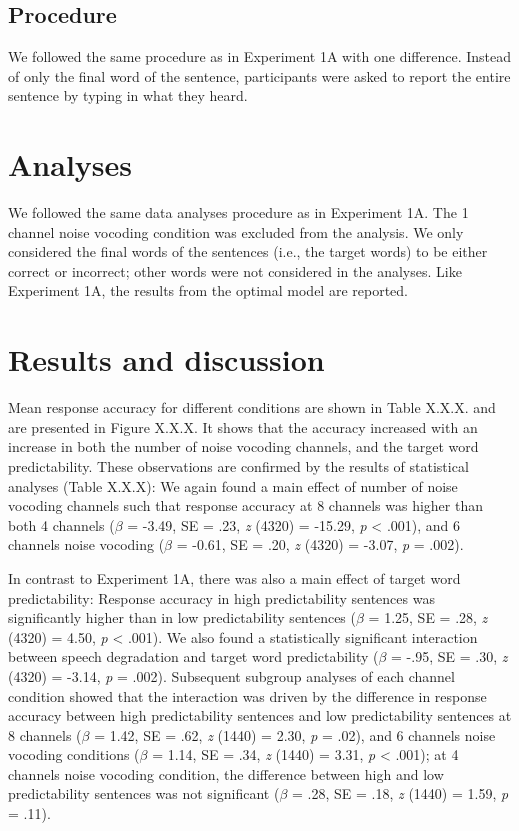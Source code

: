 \documentclass[a4paper, nobind]{templates/ociamthesis}
\begin{document}
\hypertarget{procedure-1}{%
\subsection{Procedure}\label{procedure-1}}

We followed the same procedure as in Experiment 1A with one difference.
Instead of only the final word of the sentence, participants were asked to report the entire sentence by typing in what they heard.

\hypertarget{analyses-1}{%
\section{Analyses}\label{analyses-1}}

We followed the same data analyses procedure as in Experiment 1A.
The 1 channel noise vocoding condition was excluded from the analysis.
We only considered the final words of the sentences (i.e., the target words) to be either correct or incorrect; other words were not considered in the analyses.
Like Experiment 1A, the results from the optimal model are reported.

\hypertarget{results-and-discussion-1}{%
\section{Results and discussion}\label{results-and-discussion-1}}

Mean response accuracy for different conditions are shown in Table X.X.X. and are presented in Figure X.X.X.
It shows that the accuracy increased with an increase in both the number of noise vocoding channels, and the target word predictability.
These observations are confirmed by the results of statistical analyses (Table X.X.X):
We again found a main effect of number of noise vocoding channels such that response accuracy at 8 channels was higher than both 4 channels (\(\beta\) = -3.49, SE = .23, \emph{z} (4320) = -15.29, \emph{p} \textless{} .001), and 6 channels noise vocoding (\(\beta\) = -0.61, SE = .20, \emph{z} (4320) = -3.07, \emph{p} = .002).

In contrast to Experiment 1A, there was also a main effect of target word predictability:
Response accuracy in high predictability sentences was significantly higher than in low predictability sentences (\(\beta\) = 1.25, SE = .28, \emph{z} (4320) = 4.50, \emph{p} \textless{} .001).
We also found a statistically significant interaction between speech degradation and target word predictability (\(\beta\) = -.95, SE = .30, \emph{z} (4320) = -3.14, \emph{p} = .002).
Subsequent subgroup analyses of each channel condition showed that the interaction was driven by the difference in response accuracy between high predictability sentences and low predictability sentences at 8 channels (\(\beta\) = 1.42, SE = .62, \emph{z} (1440) = 2.30, \emph{p} = .02), and 6 channels noise vocoding conditions (\(\beta\) = 1.14, SE = .34, \emph{z} (1440) = 3.31, \emph{p} \textless{} .001);
at 4 channels noise vocoding condition, the difference between high and low predictability sentences was not significant (\(\beta\) = .28, SE = .18, \emph{z} (1440) = 1.59, \emph{p} = .11).
\end{document}
